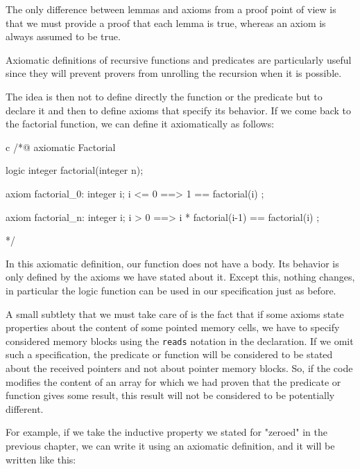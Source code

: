 The only difference between lemmas and axioms from a proof point of view
is that we must provide a proof that each lemma is true, whereas an
axiom is always assumed to be true.





Axiomatic definitions of recursive functions and predicates are
particularly useful since they will prevent provers from unrolling the
recursion when it is possible.



The idea is then not to define directly the function or the predicate
but to declare it and then to define axioms that specify its
behavior. If we come back to the factorial function, we can define it
axiomatically as follows:



\begin{CodeBlock}{c}
/*@
  axiomatic Factorial{
    logic integer factorial(integer n);

    axiom factorial_0:
      \forall integer i; i <= 0 ==> 1 == factorial(i) ;

    axiom factorial_n:
      \forall integer i; i > 0 ==> i * factorial(i-1) == factorial(i) ;
  }
*/
\end{CodeBlock}



In this axiomatic definition, our function does not have a body. Its
behavior is only defined by the axioms we have stated about it.
Except this, nothing changes, in particular the logic function can
be used in our specification just as before.



A small subtlety that we must take care of is the fact that if some
axioms state properties about the content of some pointed memory cells,
we have to specify considered memory blocks using the \texttt{reads}
notation in the declaration. If we omit such a specification, the
predicate or function will be considered to be stated about the received
pointers and not about pointer memory blocks. So, if the code modifies
the content of an array for which we had proven that the predicate or
function gives some result, this result will not be considered to be
potentially different.



For example, if we take the inductive property we stated for "zeroed" in the
previous chapter, we can write it using an axiomatic definition, and it will be
written like this:



